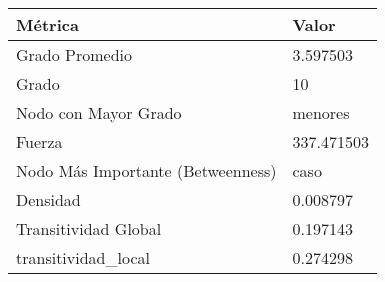 \begin{tabular}{ll}
\toprule
Métrica & Valor \\
\midrule
Grado Promedio & 3.597503 \\
Grado & 10 \\
Nodo con Mayor Grado & menores \\
Fuerza & 337.471503 \\
Nodo Más Importante (Betweenness) & caso \\
Densidad & 0.008797 \\
Transitividad Global & 0.197143 \\
transitividad_local & 0.274298 \\
\bottomrule
\end{tabular}
